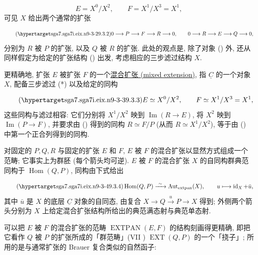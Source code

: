 \begin{equation*}
E=X^0/X^2,
\qquad F=X^1/X^3=X^1,
\end{equation*}
可见 $X$ 给出两个通常的扩张

\begin{equation}\tag{\SGARefTarget{sga7.sga7i.eix.n9-3-2}{9.3.2}}
0\longrightarrow P\longrightarrow F\longrightarrow R\longrightarrow0,
\qquad
0\longrightarrow R\longrightarrow E\longrightarrow Q\longrightarrow0,
\end{equation}
分别为 $R$ 被 $P$ 的扩张, 以及 $Q$ 被 $R$ 的扩张. 此处的观点是, 除了对象 () 外, 还从同样假定为给定的扩张结构 () 出发, 考虑相应的三步滤过结构 $X$.

更精确地, 扩张 $E$ 被扩张 $F$ 的一个\underline{混合扩张 (mixed extension)}, 指 $\underline C$ 的一个对象 $X$, 配备三步滤过 (*) 以及给定的同构

\begin{equation}\tag{\SGARefTarget{sga7.sga7i.eix.n9-3-3}{9.3.3}}
E\simeq X^0/X^2,
\qquad F\simeq X^1/X^3=X^1,
\end{equation}
这些同构与滤过相容: 它们分别将 $X^1/X^2$ 映到 $\operatorname{Im}(R\longrightarrow E)$, 将 $X^2$ 映到 $\operatorname{Im}(P\longrightarrow F)$, 并要求由 () 得到的同构 $R\simeq F/P$ (从而 $R\simeq X^1/X^2$), 等于由 () 中第一个正合列得到的同构.

对固定的 $P,Q,R$ 与固定的扩张 $E$ 和 $F$, $E$ 被 $F$ 的混合扩张以显然方式组成一个范畴; 它事实上为群胚 (每个箭头均可逆). $E$ 被 $F$ 的混合扩张 $X$ 的自同构群典范同构于 $\operatorname{Hom}(Q,P)$, 同构由下式给出

\begin{equation}\tag{\SGARefTarget{sga7.sga7i.eix.n9-3-4}{9.3.4}}
\operatorname{Hom}(Q,P)
 \xrightarrow{\ \sim\ }
\operatorname{Aut}_{\mathrm{extpan}}(X),
\qquad
u\longmapsto\operatorname{id}_X+\bar u,
\end{equation}
其中 $\bar u$ 是 $X$ 的底层 $\underline C$ 对象的自同态, 由复合 $X\longrightarrow Q\xrightarrow{u}P\longrightarrow X$ 得到; 外侧两个箭头分别为 $X$ 上给定混合扩张结构所给出的典范满态射与典范单态射.

可以把 $E$ 被 $F$ 的混合扩张的范畴 $\operatorname{EXTPAN}(E,F)$ 的结构刻画得更精确, 即把它看作 $Q$ 被 $P$ 的扩张所成的「群范畴」(VII ) $\operatorname{EXT}(Q,P)$ 的一个「挠子」; 所用的是与通常扩张的 Brauer 复合类似的自然函子:


